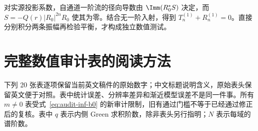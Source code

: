 对实源投影系数，自通道一阶流的径向导数由 $\Imm(R_0^*S)$ 决定，而 $S=-Q(r)|R_0|^{2n}R_0$ 使其为零。结合无一阶入射，得到 $T_n^{(1)}+R_n^{(1)}=0$。直接分别积分两条振幅再检验平衡，才构成独立数值测试。

\section{完整数值审计表的阅读方法}
下列 20 张表逐项保留当前英文稿件的原始数字；中文标题说明含义，原始表头保留英文便于对照。表中统计误差、分辨率差异和渐近模型误差不是同一件事。所有 $m\ne0$ 表受式~\eqref{eq:audit-inf-b0} 的新审计限制，旧有通过门槛不等于已经通过修正后的复核。表中 $q$ 表示内侧 Green 求积阶数，除非表头另行指明；$N$ 表示每域的谱阶数。
